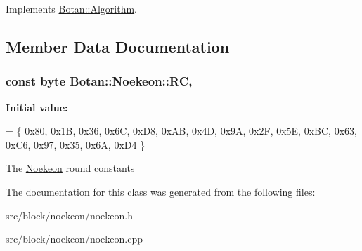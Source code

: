 Implements \hyperlink{classBotan_1_1Algorithm_a42d3ee39e051eba01ecace201fe1e6fd}{Botan\-::\-Algorithm}.



\subsection{Member Data Documentation}
\hypertarget{classBotan_1_1Noekeon_a97a6579dd49c8fcd43abeec2b48090a4}{
\subsubsection[{R\-C}]{\setlength{\rightskip}{0pt plus 5cm}const {\bf byte} Botan\-::\-Noekeon\-::\-R\-C\hspace{0.3cm}{\ttfamily [static]}, {\ttfamily [protected]}}}\label{classBotan_1_1Noekeon_a97a6579dd49c8fcd43abeec2b48090a4}
{\bfseries Initial value\-:}
\begin{DoxyCode}
= \{
   0x80, 0x1B, 0x36, 0x6C, 0xD8, 0xAB, 0x4D, 0x9A,
   0x2F, 0x5E, 0xBC, 0x63, 0xC6, 0x97, 0x35, 0x6A,
   0xD4 \}
\end{DoxyCode}
The \hyperlink{classBotan_1_1Noekeon}{Noekeon} round constants 

The documentation for this class was generated from the following files\-:\begin{DoxyCompactItemize}
\item 
src/block/noekeon/noekeon.\-h\item 
src/block/noekeon/noekeon.\-cpp\end{DoxyCompactItemize}
